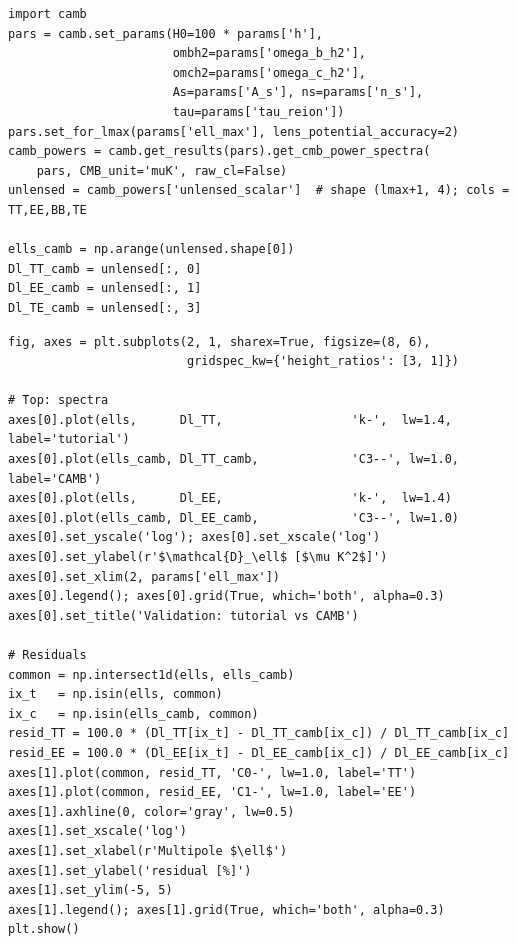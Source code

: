 \begin{codebox}
\begin{lstlisting}[style=python]
import camb
pars = camb.set_params(H0=100 * params['h'],
                       ombh2=params['omega_b_h2'],
                       omch2=params['omega_c_h2'],
                       As=params['A_s'], ns=params['n_s'],
                       tau=params['tau_reion'])
pars.set_for_lmax(params['ell_max'], lens_potential_accuracy=2)
camb_powers = camb.get_results(pars).get_cmb_power_spectra(
    pars, CMB_unit='muK', raw_cl=False)
unlensed = camb_powers['unlensed_scalar']  # shape (lmax+1, 4); cols = TT,EE,BB,TE

ells_camb = np.arange(unlensed.shape[0])
Dl_TT_camb = unlensed[:, 0]
Dl_EE_camb = unlensed[:, 1]
Dl_TE_camb = unlensed[:, 3]
\end{lstlisting}
\end{codebox}

\begin{codebox}
\begin{lstlisting}[style=python]
fig, axes = plt.subplots(2, 1, sharex=True, figsize=(8, 6),
                         gridspec_kw={'height_ratios': [3, 1]})

# Top: spectra
axes[0].plot(ells,      Dl_TT,                  'k-',  lw=1.4, label='tutorial')
axes[0].plot(ells_camb, Dl_TT_camb,             'C3--', lw=1.0, label='CAMB')
axes[0].plot(ells,      Dl_EE,                  'k-',  lw=1.4)
axes[0].plot(ells_camb, Dl_EE_camb,             'C3--', lw=1.0)
axes[0].set_yscale('log'); axes[0].set_xscale('log')
axes[0].set_ylabel(r'$\mathcal{D}_\ell$ [$\mu K^2$]')
axes[0].set_xlim(2, params['ell_max'])
axes[0].legend(); axes[0].grid(True, which='both', alpha=0.3)
axes[0].set_title('Validation: tutorial vs CAMB')

# Residuals
common = np.intersect1d(ells, ells_camb)
ix_t   = np.isin(ells, common)
ix_c   = np.isin(ells_camb, common)
resid_TT = 100.0 * (Dl_TT[ix_t] - Dl_TT_camb[ix_c]) / Dl_TT_camb[ix_c]
resid_EE = 100.0 * (Dl_EE[ix_t] - Dl_EE_camb[ix_c]) / Dl_EE_camb[ix_c]
axes[1].plot(common, resid_TT, 'C0-', lw=1.0, label='TT')
axes[1].plot(common, resid_EE, 'C1-', lw=1.0, label='EE')
axes[1].axhline(0, color='gray', lw=0.5)
axes[1].set_xscale('log')
axes[1].set_xlabel(r'Multipole $\ell$')
axes[1].set_ylabel('residual [%]')
axes[1].set_ylim(-5, 5)
axes[1].legend(); axes[1].grid(True, which='both', alpha=0.3)
plt.show()
\end{lstlisting}
\end{codebox}

